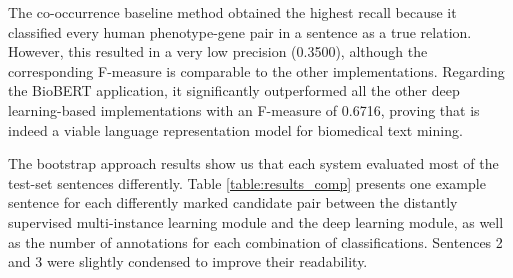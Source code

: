 The co-occurrence baseline method obtained the highest recall because it classified every human phenotype-gene pair in a sentence as a true relation. However, this resulted in a very low precision (0.3500), although the corresponding F-measure is comparable to the other implementations. Regarding the BioBERT application, it significantly outperformed all the other deep learning-based implementations with an F-measure of 0.6716, proving that is indeed a viable language representation model for biomedical text mining.

The bootstrap approach results show us that each system evaluated most of the test-set sentences differently. Table \ref{table:results_comp} presents one example sentence for each differently marked candidate pair between the distantly supervised multi-instance learning module and the deep learning module, as well as the number of annotations for each combination of classifications. Sentences 2 and 3 were slightly condensed to improve their readability.  

